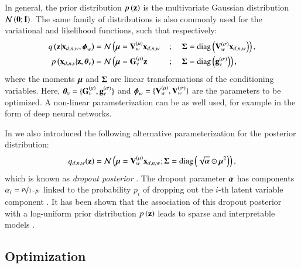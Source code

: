 In general, the prior distribution $p\left(\mathbf{z}\right)$ is the  multivariate Gaussian distribution $\mathcal{N}\left(\mathbf{0};\mathbf{I}\right)$.
The same family of distributions is also commonly used for the variational and likelihood functions, such that respectively:
\begin{alignat}{4}
\label{eq:encoder}
q\left(\mathbf{z}|\mathbf{x}_{d,n,w}, \boldsymbol{\phi}_w\right)  &= \mathcal{N} \left( \boldsymbol{\mu} = \mathbf{V}_w^{(\mu)} \mathbf{x}_{d,n,w} \right. &&{}; &&\left.\boldsymbol{\Sigma} = \operatorname{diag}\left(\mathbf{V}_w^{(\sigma)} \mathbf{x}_{d,n,w}\right) \right), \\
\label{eq:decoder}
p\left(\mathbf{x}_{d,n,v}|\mathbf{z},\boldsymbol{\theta}_v\right) &= \mathcal{N} \left( \boldsymbol{\mu} = \mathbf{G}_v^{(\mu)} \mathbf{z} \right. &&{} ; &&\left.\boldsymbol{\Sigma} = \operatorname{diag}\left(\mathbf{g}_v^{(\sigma)}\right) \right),
\end{alignat}
where the moments $\boldsymbol{\mu}$ and $\boldsymbol{\Sigma}$ are linear transformations of the conditioning variables.
Here, $\boldsymbol{\theta}_v = \{\mathbf{G}_v^{(\mu)}, \mathbf{g}_v^{(\sigma)}\}$ and $\boldsymbol{\phi}_w=\{\mathbf{V}_w^{(\mu)}, \mathbf{V}_w^{(\sigma)}\}$ are the parameters to be optimized.
A non-linear parameterization can be as well used, for example in the form of deep neural networks.

In \cite{Antelmi2019} we also introduced the following alternative parameterization for the posterior distribution:
\begin{equation}
\label{eq:dropout_posterior}
    q_{d,n,w}(\mathbf{z}) = \mathcal{N}\left(\boldsymbol{\mu} = \mathbf{V}_w^{(\mu)} \mathbf{x}_{d,n,w};\boldsymbol{\Sigma} = \operatorname{diag}\left(\sqrt{\boldsymbol{\alpha}} \odot \boldsymbol{\mu}^2\right)\right),
\end{equation}
which is known as \textit{dropout posterior} \citep{Kingma2015}.
The dropout parameter $\boldsymbol{\alpha}$ has components $\alpha_i = \nicefrac{p_i}{1-p_i}$ linked to the probability $p_i$ of dropping out the $i$-th latent variable component \citep{Wang2013}.
It has been shown that the association of this dropout posterior with a log-uniform prior distribution $p\left(\mathbf{z}\right)$ leads to sparse and interpretable models \citep{Antelmi2019,Molchanov2017}.

\subsection{Optimization}
\label{ssec:optimization}

